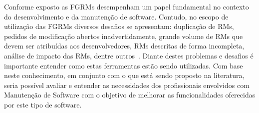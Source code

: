 Conforme exposto as FGRMs desempenham um papel fundamental no contexto do
desenvolvimento e da manutenção de software. Contudo, no escopo de utilização
das FGRMs diversos desafios se apresentam: duplicação de RMs, pedidos de
modificação abertos inadvertidamente, grande volume de RMs que devem ser
atribuídas aos desenvolvedores, RMs descritas de forma incompleta,
análise de impacto das RMs, dentre outros~\cite{cavalcanti2014challenges}.
Diante destes problemas e desafios é importante entender como estas ferramentas
estão sendo utilizadas. Com base neste conhecimento, em conjunto com o que está
sendo proposto na literatura, seria possível avaliar e entender as necessidades
dos profissionais envolvidos com Manutenção de Software com o objetivo de
melhorar as funcionalidades oferecidas por este tipo de software.

%
%
%
%

